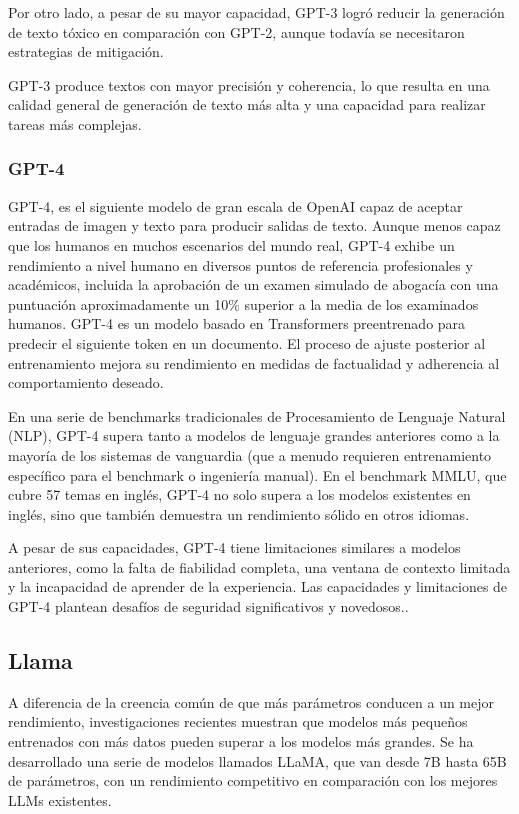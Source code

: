Por otro lado, a pesar de su mayor capacidad, GPT-3 logró reducir la generación de texto tóxico en comparación con GPT-2, aunque todavía se necesitaron estrategias de mitigación.

GPT-3 produce textos con mayor precisión y coherencia, lo que resulta en una calidad general de generación de texto más alta y una capacidad para realizar tareas más complejas.

\subsubsection{GPT-4}

GPT-4,\citep{GPT4} es el siguiente modelo de gran escala de OpenAI capaz de aceptar entradas de imagen y texto para producir salidas de texto. Aunque menos capaz que los humanos en muchos escenarios del mundo real, GPT-4 exhibe un rendimiento a nivel humano en diversos puntos de referencia profesionales y académicos, incluida la aprobación de un examen simulado de abogacía con una puntuación aproximadamente un 10$\%$ superior a la media de los examinados humanos. GPT-4 es un modelo basado en Transformers preentrenado para predecir el siguiente token en un documento. El proceso de ajuste posterior al entrenamiento mejora su rendimiento en medidas de factualidad y adherencia al comportamiento deseado.

En una serie de benchmarks tradicionales de Procesamiento de Lenguaje Natural (NLP), GPT-4 supera tanto a modelos de lenguaje grandes anteriores como a la mayoría de los sistemas de vanguardia (que a menudo requieren entrenamiento específico para el benchmark o ingeniería manual). En el benchmark MMLU, que cubre 57 temas en inglés, GPT-4 no solo supera a los modelos existentes en inglés, sino que también demuestra un rendimiento sólido en otros idiomas.

A pesar de sus capacidades, GPT-4 tiene limitaciones similares a modelos anteriores, como la falta de fiabilidad completa, una ventana de contexto limitada y la incapacidad de aprender de la experiencia. Las capacidades y limitaciones de GPT-4 plantean desafíos de seguridad significativos y novedosos..

\subsection{Llama}
A diferencia de la creencia común de que más parámetros conducen a un mejor rendimiento, investigaciones recientes muestran que modelos más pequeños entrenados con más datos pueden superar a los modelos más grandes. Se ha desarrollado una serie de modelos llamados LLaMA, \cite{touvron2023llama} que van desde 7B hasta 65B de parámetros, con un rendimiento competitivo en comparación con los mejores LLMs existentes.

